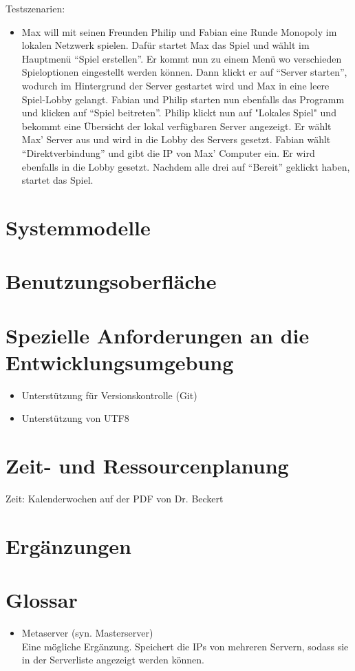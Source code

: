 \documentclass[a4paper,10pt]{article}
\begin{document}
Testszenarien:
\begin{itemize}
\item Max will mit seinen Freunden Philip und Fabian eine Runde Monopoly im lokalen Netzwerk spielen. Dafür startet Max das Spiel und wählt im Hauptmenü ``Spiel erstellen''. Er kommt nun zu einem Menü wo verschieden Spieloptionen eingestellt werden können. Dann klickt er auf ``Server starten'', wodurch im Hintergrund der Server gestartet wird und Max in eine leere Spiel-Lobby gelangt. Fabian und Philip starten nun ebenfalls das Programm und klicken auf ``Spiel beitreten''. Philip klickt nun auf "Lokales Spiel" und bekommt eine Übersicht der lokal verfügbaren Server angezeigt. Er wählt Max' Server aus und wird in die Lobby des Servers gesetzt.
Fabian wählt ``Direktverbindung'' und gibt die IP von Max' Computer ein. Er wird ebenfalls in die Lobby gesetzt. Nachdem alle drei auf ``Bereit'' geklickt haben, startet das Spiel.
\end{itemize}
\section{Systemmodelle}
\section{Benutzungsoberfläche}
\section{Spezielle Anforderungen an die Entwicklungsumgebung}
\begin{itemize}
\item Unterstützung für Versionskontrolle (Git)
\item Unterstützung von UTF8
\end{itemize}
\section{Zeit- und Ressourcenplanung}
Zeit: Kalenderwochen auf der PDF von Dr. Beckert
\section{Ergänzungen}
\section{Glossar}
\begin{itemize}
\item Metaserver (syn. Masterserver) \\
Eine mögliche Ergänzung. Speichert die IPs von mehreren Servern, sodass sie in der Serverliste angezeigt werden können.
\end{itemize}
\end{document}
